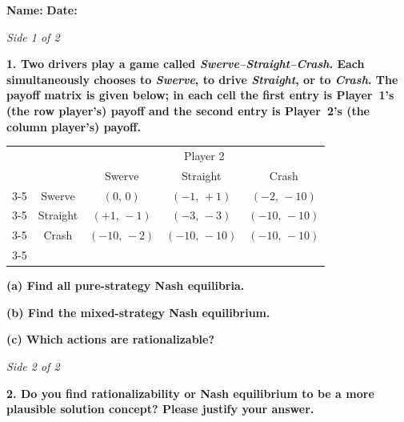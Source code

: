 \documentclass[12pt]{article}
\begin{document}
\noindent
\textbf{Name:}\underline{\hspace{6cm}} \hfill \textbf{Date:}\underline{\hspace{3cm}}

\vspace{0.5em}
\noindent\textit{Side 1 of 2}

\vspace{1.5em}
\noindent\textbf{1. Two drivers play a game called \emph{Swerve--Straight--Crash}. Each simultaneously chooses to \emph{Swerve}, to drive \emph{Straight}, or to \emph{Crash}. The payoff matrix is given below; in each cell the first entry is Player~1's (the row player's) payoff and the second entry is Player~2's (the column player's) payoff.}

\vspace{1em}
\begin{center}
\renewcommand{\arraystretch}{1.4}
\begin{tabular}{cc|c|c|c|}
\multicolumn{2}{c}{} & \multicolumn{3}{c}{Player 2} \\
\multicolumn{2}{c}{} & \multicolumn{1}{c}{Swerve} & \multicolumn{1}{c}{Straight} & \multicolumn{1}{c}{Crash} \\
\cline{3-5}
\multirow{3}{*}{Player 1} & Swerve & $(0,\,0)$ & $(-1,\,+1)$ & $(-2,\,-10)$ \\
\cline{3-5}
 & Straight & $(+1,\,-1)$ & $(-3,\,-3)$ & $(-10,\,-10)$ \\
\cline{3-5}
 & Crash & $(-10,\,-2)$ & $(-10,\,-10)$ & $(-10,\,-10)$ \\
\cline{3-5}
\end{tabular}
\end{center}

\vspace{1em}
\noindent\textbf{(a) Find all pure-strategy Nash equilibria.}

\vfill

\noindent\textbf{(b) Find the mixed-strategy Nash equilibrium.}

\vfill

\noindent\textbf{(c) Which actions are rationalizable?}

\vfill\newpage

\noindent\textit{Side 2 of 2}

\vspace{1.5em}
\noindent\textbf{2. Do you find rationalizability or Nash equilibrium to be a more plausible solution concept? Please justify your answer.}

\vfill
\end{document}
